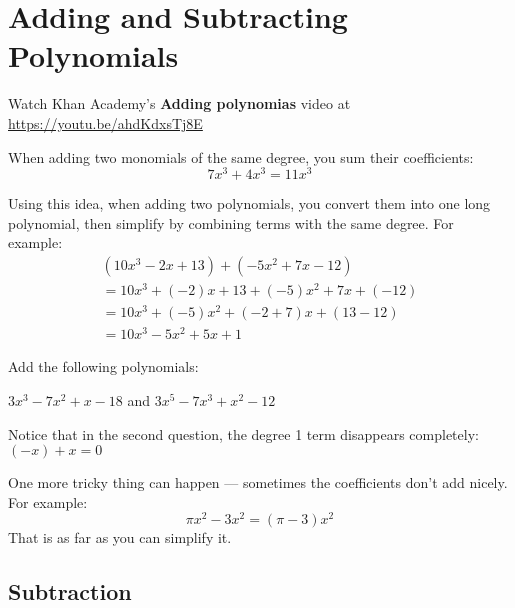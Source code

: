 \chapter{Adding and Subtracting Polynomials}

Watch Khan Academy's \textbf{Adding polynomias} video at \url{https://youtu.be/ahdKdxsTj8E}

When adding two monomials of the same degree, you sum their coefficients:
\begin{equation*}
  7x^3 + 4x^3 = 11x^3
\end{equation*}

Using this idea, when adding two polynomials, you convert them into one long
polynomial, then simplify by combining terms with the same degree. For example:
\begin{multline*}
  (10x^3 - 2x + 13) + (-5x^2 + 7x -12) \\
  = 10x^3 + (-2)x + 13 + (-5)x^2 + 7x + (-12) \\
  = 10x^3 + (-5)x^2 + (-2 + 7)x + (13 - 12) \\
  = 10x^3 - 5x^2 + 5x + 1
\end{multline*}

\begin{Exercise}[title=Adding Polynomials Practice, label=addpns]
  Add the following polynomials:
  \vspace{20mm}
  \vspace{20mm}
\end{Exercise}
\begin{Answer}[ref=addpns]$3x^3 - 7x^2 + x - 18$ and $3x^5 - 7x^3 + x^2 - 12$\end{Answer}

Notice that in the second question, the degree 1 term disappears completely: $(-x) + x = 0$

One more tricky thing can happen --- sometimes the coefficients don't add nicely.  For example:
\begin{equation*}
  \pi x^2 - 3 x^2 = (\pi - 3) x^2
\end{equation*}
That is as far as you can simplify it.
    
\section{Subtraction}

